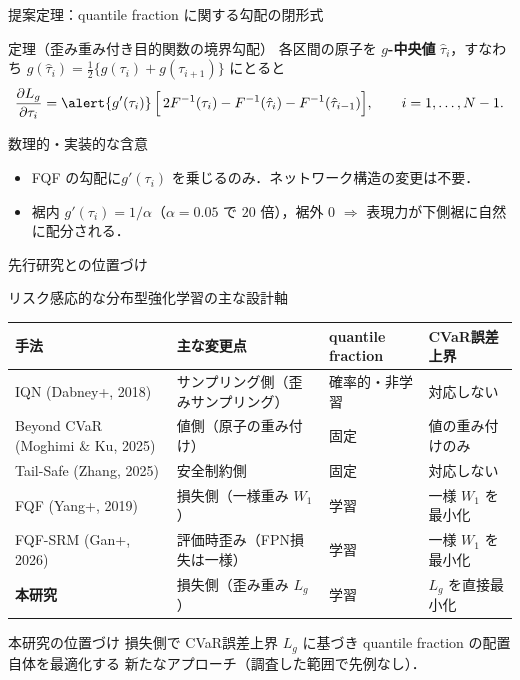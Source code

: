 \documentclass[aspectratio=169, 10pt]{beamer}
\newcommand{\green}[1]{\textcolor{green!40!black}{#1}}
\newcommand{\blue}[1]{\textcolor{blue!80!black}{#1}}
\providecommand{\Finv}{}\renewcommand{\Finv}{F^{-1}}
\newcommand{\Lg}{L_g}
\begin{document}
\begin{frame}{提案定理：quantile fraction に関する勾配の閉形式}
  \begin{exampleblock}{定理（歪み重み付き目的関数の境界勾配）}
    各区間の原子を \textbf{$g$-中央値} $\hat\tau_i$，すなわち
    $g(\hat\tau_i)=\tfrac12\{g(\tau_i)+g(\tau_{i+1})\}$ にとると
    \[
      \frac{\partial \Lg}{\partial \tau_i}
      = \alert{g'(\tau_i)}\,\Bigl[\,2\Finv(\tau_i)-\Finv(\hat\tau_i)-\Finv(\hat\tau_{i-1})\Bigr],
      \qquad i=1,\dots,N-1 .
    \]
  \end{exampleblock}
  \begin{block}{数理的・実装的な含意}
    \begin{itemize}
      \item FQF の勾配に\alert{$g'(\tau_i)$ を乗じるのみ}．ネットワーク構造の変更は不要．
      \item 裾内 $g'(\tau_i)=1/\alpha$（$\alpha=0.05$ で $20$ 倍），裾外 $0$
            $\Rightarrow$ 表現力が\blue{下側裾に自然に配分}される．
    \end{itemize}
  \end{block}
\end{frame}

\begin{frame}{先行研究との位置づけ}
  \begin{block}{リスク感応的な分布型強化学習の主な設計軸}
    \centering
    \scriptsize
    \setlength{\tabcolsep}{3pt}
    \begin{tabular}{@{}llll@{}}
      \toprule
      手法 & 主な変更点 & quantile fraction & CVaR誤差上界 \\
      \midrule
      IQN (Dabney+, 2018) & サンプリング側（歪みサンプリング） & 確率的・非学習 & 対応しない \\
      Beyond CVaR (Moghimi \& Ku, 2025) & 値側（原子の重み付け） & 固定 & 値の重み付けのみ \\
      Tail-Safe (Zhang, 2025) & 安全制約側 & 固定 & 対応しない \\
      FQF (Yang+, 2019) & 損失側（一様重み $W_1$） & \green{学習} & 一様 $W_1$ を最小化 \\
      FQF-SRM (Gan+, 2026) & 評価時歪み（FPN損失は一様） & \green{学習} & 一様 $W_1$ を最小化 \\
      \textbf{本研究} & \alert{損失側（歪み重み $\Lg$）} & \green{学習} & \alert{$\Lg$ を直接最小化} \\
      \bottomrule
    \end{tabular}
  \end{block}
  \begin{exampleblock}{本研究の位置づけ}
    \alert{損失側}で CVaR誤差上界 $\Lg$ に基づき quantile fraction の\alert{配置自体}を最適化する
    新たなアプローチ（調査した範囲で先例なし）．
  \end{exampleblock}
\end{frame}
\end{document}

